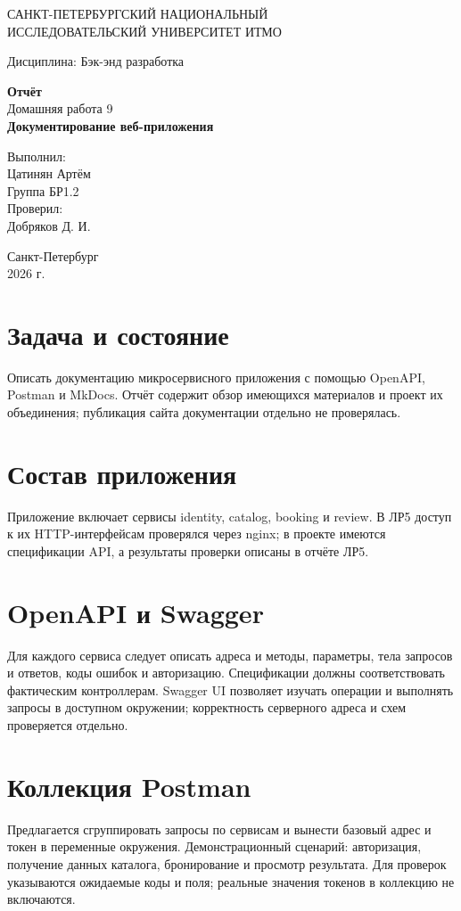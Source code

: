 \documentclass[14pt,a4paper]{extarticle}
\begin{document}
\begin{titlepage}\begin{center}
САНКТ-ПЕТЕРБУРГСКИЙ НАЦИОНАЛЬНЫЙ\\ ИССЛЕДОВАТЕЛЬСКИЙ УНИВЕРСИТЕТ ИТМО
\vspace{1.5cm}

Дисциплина: Бэк-энд разработка
\vspace{1.5cm}

\textbf{Отчёт}\\[0.5cm]
Домашняя работа 9\\[0.5cm]
\textbf{Документирование веб-приложения}
\vfill
\begin{flushright}Выполнил:\\ Цатинян Артём\\ Группа БР1.2\\[0.8cm] Проверил:\\ Добряков Д. И.\end{flushright}
\vfill Санкт-Петербург\\ 2026 г.\end{center}\end{titlepage}
\section{Задача и состояние}
Описать документацию микросервисного приложения с помощью OpenAPI, Postman и MkDocs. Отчёт содержит обзор имеющихся материалов и проект их объединения; публикация сайта документации отдельно не проверялась.
\section{Состав приложения}
Приложение включает сервисы identity, catalog, booking и review. В ЛР5 доступ к их HTTP-интерфейсам проверялся через nginx; в проекте имеются спецификации API, а результаты проверки описаны в отчёте ЛР5.
\section{OpenAPI и Swagger}
Для каждого сервиса следует описать адреса и методы, параметры, тела запросов и ответов, коды ошибок и авторизацию. Спецификации должны соответствовать фактическим контроллерам. Swagger UI позволяет изучать операции и выполнять запросы в доступном окружении; корректность серверного адреса и схем проверяется отдельно.
\section{Коллекция Postman}
Предлагается сгруппировать запросы по сервисам и вынести базовый адрес и токен в переменные окружения. Демонстрационный сценарий: авторизация, получение данных каталога, бронирование и просмотр результата. Для проверок указываются ожидаемые коды и поля; реальные значения токенов в коллекцию не включаются.
\end{document}
